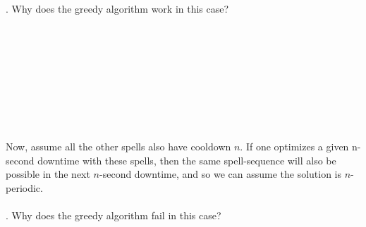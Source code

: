 \documentclass[12pt]{article}
\begin{document}
. Why does the greedy algorithm work in this case?\\\\\\\\\\\\\\\\\\\\
Now, assume all the other spells also have cooldown $n$. 
If one optimizes a given n-second downtime with these spells, 
then the same spell-sequence will also be possible in the next 
$n$-second downtime, and so we can assume the solution is $n$-periodic.\\\\
. Why does the greedy algorithm fail in this case?\\\\\\\\\\\\\\\\\\\\ 
\end{document}
